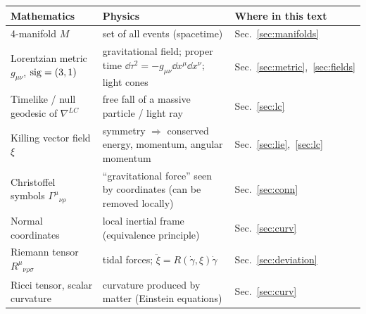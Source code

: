
\begin{center}
\begin{tabular}{@{}p{4.1cm}p{5.1cm}p{5.2cm}@{}}
\toprule
\textbf{Mathematics} & \textbf{Physics} & \textbf{Where in this text}\\ \midrule
4-manifold $M$ & set of all events (spacetime) & Sec.~\ref{sec:manifolds}\\
Lorentzian metric $g_{\mu\nu}$, $\operatorname{sig}=(3,1)$ & gravitational field; proper time $\dd\tau^2=-g_{\mu\nu}\dd x^\mu\dd x^\nu$; light cones & Sec.~\ref{sec:metric},~\ref{sec:fields}\\
Timelike / null geodesic of $\nabla^{LC}$ & free fall of a massive particle / light ray & Sec.~\ref{sec:lc}\\
Killing vector field $\xi$ & symmetry $\Rightarrow$ conserved energy, momentum, angular momentum & Sec.~\ref{sec:lie},~\ref{sec:lc}\\
Christoffel symbols $\Gamma^\mu{}_{\nu\rho}$ & ``gravitational force'' seen by coordinates (can be removed locally) & Sec.~\ref{sec:conn}\\
Normal coordinates & local inertial frame (equivalence principle) & Sec.~\ref{sec:curv}\\
Riemann tensor $R^\mu{}_{\nu\rho\sigma}$ & tidal forces; $\ddot\xi=R(\dot\gamma,\xi)\dot\gamma$ & Sec.~\ref{sec:deviation}\\
Ricci tensor, scalar curvature & curvature produced by matter (Einstein equations) & Sec.~\ref{sec:curv}\\ \bottomrule
\end{tabular}
\end{center}

